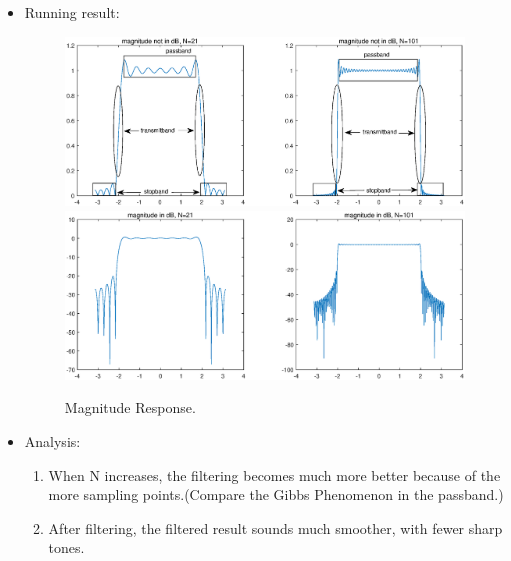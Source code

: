 \documentclass[onecolumn,oneside]{SUSTechHomework}
\begin{document}
\begin{itemize}
	\item Running result:
	\begin{figure}[H]
		\centering
		\includegraphics[width=170mm]{pictures/1.eps}
		\includegraphics[width=170mm]{pictures/2.eps}
		\caption{Magnitude Response.}
	\end{figure}
	\item Analysis:
	\begin{enumerate}
		\item When N increases, the filtering becomes much more better because of the more sampling points.(Compare the Gibbs Phenomenon in the passband.)
		\item After filtering, the filtered result sounds much smoother, with fewer sharp tones.
	\end{enumerate}
\end{itemize}
\end{document}
